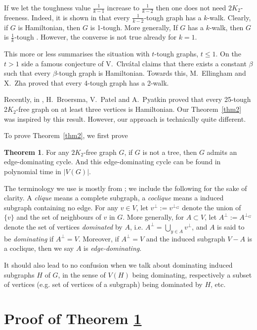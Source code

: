 \documentclass{amsart}
\theoremstyle{definition}
\newtheorem{theorem}{Theorem}
\begin{document}
If we let the toughness value $\frac{1}{k-1}$ increase to 
$\frac{1}{k-2}$ then
one does not need $2K_2$-freeness. Indeed, it is shown in 
\cite{jackson1990k} that
every $\frac{1}{k-2}$-tough graph has a $k$-walk. 
Clearly, if $G$ is
Hamiltonian, then $G$ is 1-tough.  More generally, 
If $G$ has a $k$-walk, then $G$ is $\frac{1}{k}$-tough \cite{jackson1990k}.
However, the converse is not true already for $k=1$.  

This more or less summarises the situation with $t$-tough graphs, $t\leq 1$.
On the $t>1$ side 
a famous conjecture of V.~Chv\'{a}tal \cite{chvatal1973tough} claims
that there exists a constant $\beta$ such that every
$\beta$-tough graph is Hamiltonian.  
Towards this, 
M.~Ellingham and X.~Zha \cite{ellingham2000toughness} proved that
every 4-tough graph has a 2-walk.

Recently, in \cite{broersma2014toughness}, H.~Broersma, V.~Patel and A.~Pyatkin proved that 
every 25-tough 2$K_2$-free graph on at least three vertices is Hamiltonian.
Our Theorem~\ref{thm2} was inspired by this result.  
However, our approach is technically quite different. 

To prove Theorem~\ref{thm2}, we first prove
\begin{theorem}\label{addgen1} 
For any $2K_2$-free graph $G$, if $G$ is not a tree, then $G$ admits an edge-dominating cycle. And this edge-dominating cycle can be found in polynomial time in $|V(G)|$.
\end{theorem}

The terminology we use is  mostly from \cite{bomu08}; we include the following for the sake of
clarity.  
A {\em clique} means a complete subgraph, a {\em coclique} means a
induced subgraph containing no edge. 
For any
$v\in V$, let $v^\perp:=v^{\perp_G}$ denote the union of $\{v\}$ and the set of
neighbours of $v$ in $G$.  More generally, for $A\subset V$, let
$A^\perp:=A^{\perp_G}$ denote the set of vertices {\em dominated} by $A$, i.e.
$A^\perp=\bigcup\limits_{y\in A}v^\perp$, and $A$ is said to be {\em
dominating} if $A^\perp=V$.
Moreover, if $A^{\perp}=V$ and the induced subgraph $V-A$ is a coclique, then we say $A$ is {\em edge-dominating}. 
 
It should also lead to no confusion when we talk
about  dominating induced subgraphs $H$ of $G$, in the sense of $V(H)$ being
dominating, respectively a subset of vertices (e.g. set of vertices of a
subgraph) being dominated by $H$, etc.

\section{Proof of Theorem \ref{addgen1}}
\end{document}
